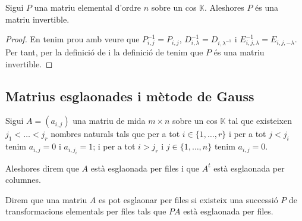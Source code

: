 \documentclass[../../Main.tex]{subfiles}
\begin{document}
	\begin{proposition}
		\label{prop:les matrius elementals són invertibles}
		Sigui \(P\) una matriu elemental d'ordre \(n\) sobre un cos \(\mathbb{K}\). Aleshores \(P\) és una matriu invertible.
		\begin{proof}
			En tenim prou amb veure que \(P_{i,j}^{-1}=P_{i,j}\), \(D_{i,\lambda}^{-1}=D_{i,\lambda^{-1}}\) i \(E_{i,j,\lambda}^{-1}=E_{i,j,-\lambda}\). Per tant, per la definició de  i la definició de  tenim que \(P\) és una matriu invertible.
		\end{proof}
	\end{proposition}
	\subsection{Matrius esglaonades i mètode de Gauss}
	\begin{definition}
		\label{def:matriu esglaonada}
		Sigui \(A=(a_{i,j})\) una matriu de mida \(m\times n\) sobre un cos \(\mathbb{K}\) tal que existeixen \(j_{1}<\dots<j_{r}\) nombres naturals tals que per a tot \(i\in\{1,\dots,r\}\) i per a tot \(j<j_{i}\) tenim \(a_{i,j}=0\) i \(a_{i,j_{i}}=1\); i per a tot \(i>j_{r}\) i \(j\in\{1,\dots,n\}\) tenim \(a_{i,j}=0\).
		
		Aleshores direm que \(A\) està esglaonada per files i que \(A^{t}\) està esglaonada per columnes.
		
		Direm que una matriu \(A\) es pot esglaonar per files si existeix una successió \(P\) de transformacions elementals per files tals que \(PA\) està esglaonada per files.
	\end{definition}
\end{document}
